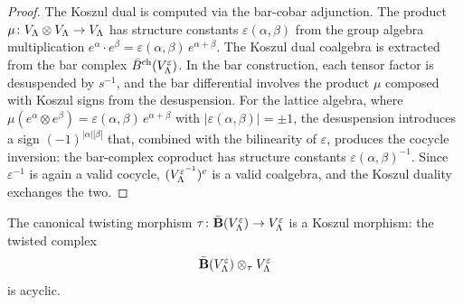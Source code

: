 \begin{proof}
The Koszul dual is computed via the bar-cobar adjunction. The
product $\mu \colon V_\Lambda \otimes V_\Lambda \to V_\Lambda$
has structure constants $\varepsilon(\alpha,\beta)$ from the group
algebra multiplication $e^\alpha \cdot e^\beta =
\varepsilon(\alpha,\beta)\,e^{\alpha+\beta}$.
The Koszul dual coalgebra is extracted from the bar complex
$\bar{B}^{\mathrm{ch}}(V_\Lambda^\varepsilon)$.  In the bar construction,
each tensor factor is desuspended by $s^{-1}$, and the bar differential
involves the product $\mu$ composed with Koszul signs from the
desuspension.  For the lattice algebra, where $\mu(e^\alpha \otimes
e^\beta) = \varepsilon(\alpha,\beta)\,e^{\alpha+\beta}$ with
$|\varepsilon(\alpha,\beta)| = \pm 1$, the desuspension introduces a
sign $(-1)^{|\alpha||\beta|}$ that, combined with the bilinearity of
$\varepsilon$, produces the cocycle inversion:
the bar-complex coproduct has structure constants
$\varepsilon(\alpha,\beta)^{-1}$.
Since $\varepsilon^{-1}$ is again a valid cocycle,
$(V_\Lambda^{\varepsilon^{-1}})^c$ is a valid coalgebra, and the
Koszul duality exchanges the two.
\end{proof}

\begin{theorem}
\label{thm:lattice:koszul-morphism}
The canonical twisting morphism
$\tau \colon \bar{\mathbf{B}}(V_\Lambda^\varepsilon) \to
V_\Lambda^\varepsilon$
is a Koszul morphism: the twisted complex
\[
\bar{\mathbf{B}}(V_\Lambda^\varepsilon)
\otimes_\tau V_\Lambda^\varepsilon
\]
is acyclic.
\end{theorem}

